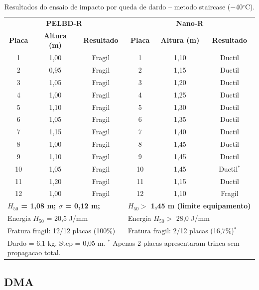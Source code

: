 \documentclass[11pt,a4paper]{article}
\begin{document}
\begin{table}[H]\centering
\caption{Resultados do ensaio de impacto por queda de dardo -- metodo staircase ($-$40$^{\circ}$C).}\label{tab:dardo}
\begin{tabular}{ccc|ccc}
\toprule
\multicolumn{3}{c|}{\bfseries PELBD-R} & \multicolumn{3}{c}{\bfseries Nano-R} \\
{\bfseries Placa} & {\bfseries Altura (m)} & {\bfseries Resultado} & {\bfseries Placa} & {\bfseries Altura (m)} & {\bfseries Resultado} \\
\midrule
1 & 1,00 & Fragil & 1 & 1,10 & Ductil \\
2 & 0,95 & Fragil & 2 & 1,15 & Ductil \\
3 & 1,05 & Fragil & 3 & 1,20 & Ductil \\
4 & 1,00 & Fragil & 4 & 1,25 & Ductil \\
5 & 1,10 & Fragil & 5 & 1,30 & Ductil \\
6 & 1,05 & Fragil & 6 & 1,35 & Ductil \\
7 & 1,15 & Fragil & 7 & 1,40 & Ductil \\
8 & 1,00 & Fragil & 8 & 1,45 & Ductil \\
9 & 1,10 & Fragil & 9 & 1,45 & Ductil \\
10 & 1,05 & Fragil & 10 & 1,45 & Ductil$^*$ \\
11 & 1,20 & Fragil & 11 & 1,15 & Ductil \\
12 & 1,00 & Fragil & 12 & 1,10 & Fragil \\
\midrule
\multicolumn{3}{l}{{\bfseries $H_{50}$ = 1,08 m; $\sigma$ = 0,12 m;}} & \multicolumn{3}{l}{{\bfseries $H_{50} >$ 1,45 m (limite equipamento)}} \\
\multicolumn{3}{l}{Energia $H_{50}$ = 20,5 J/mm} & \multicolumn{3}{l}{Energia $H_{50} >$ 28,0 J/mm} \\
\multicolumn{3}{l}{Fratura fragil: 12/12 placas (100\%)} & \multicolumn{3}{l}{Fratura fragil: 2/12 placas (16,7\%)$^*$} \\
\multicolumn{6}{l}{Dardo = 6,1 kg. Step = 0,05 m. $^*$ Apenas 2 placas apresentaram trinca sem propagacao total.} \\
\bottomrule
\end{tabular}
\end{table}

\subsection{DMA}
\end{document}
